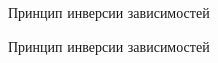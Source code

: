 \documentclass[10pt,pdf,hyperref={unicode}]{beamer}%
\begin{document}
\begin{frame}{Принцип инверсии зависимостей}
\begin{figure}[h]
\end{figure}
\end{frame}


\begin{frame}{Принцип инверсии зависимостей}
\begin{figure}[h]
\end{figure}
\end{frame}
\end{document}

